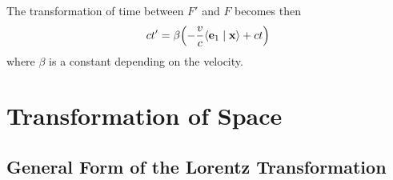\documentclass[12pt]{article}
\newcommand{\ip}[2]{\langle #1 \mid #2 \rangle}
\begin{document}
The transformation of time between $F'$ and $F$ becomes then
\begin{equation}
  ct' = \beta\!\left(-\frac{v}{c}\ip{\vb{e}_1}{\vb{x}} + ct\right)
  \label{eq:transformation_of_time}
\end{equation}
where $\beta$ is a constant depending on the velocity.

\section{Transformation of Space}

\subsection{General Form of the Lorentz Transformation}
\end{document}
